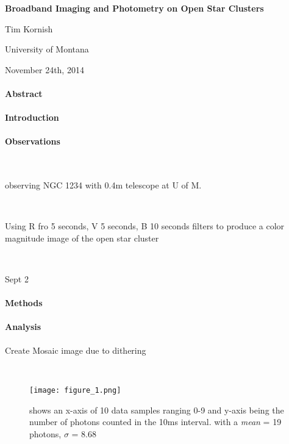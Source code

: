 \documentclass[12 pt,twoside]{article}
\begin{document}
\begin{center}

{\LARGE{\bf Broadband Imaging and Photometry on Open Star Clusters}}

{\large Tim Kornish}

University of Montana

November 24th, 2014
\end{center}

\paragraph{Abstract}

\paragraph{Introduction}

\paragraph{Observations}

\ \

observing NGC 1234 with 0.4m telescope at U of M. 

\ \

Using R fro 5 seconds, V 5 seconds, B 10 seconds filters to produce a color magnitude image of the open star cluster

\ \

Sept 2


\paragraph{Methods}

\paragraph{Analysis}

Create Mosaic image due to dithering

\ \

\begin{center}
\begin{figure}[!hb]
\texttt{[image: figure\_1.png]}
\caption{\small{shows an x-axis of 10 data samples ranging 0-9 and y-axis being the number of photons counted in the 10ms interval. with a {\it mean} = 19 photons, $\sigma$ = 8.68 }}
\end{figure}
\end{center}
\end{document}
